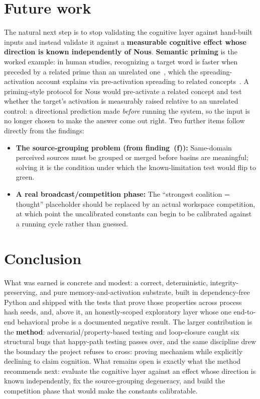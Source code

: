 \documentclass[11pt]{article}
\begin{document}
\section{Future work}\label{sec:future}
The natural next step is to stop validating the cognitive layer against hand-built inputs and instead
validate it against a \textbf{measurable cognitive effect whose direction is known independently of
Nous}. \textbf{Semantic priming} is the worked example: in human studies, recognizing a target word is
faster when preceded by a related prime than an unrelated one~\cite{meyer1971}, which the
spreading-activation account explains via pre-activation spreading to related concepts~\cite{collins1975}.
A priming-style protocol for Nous would pre-activate a related concept and test whether the target's
activation is measurably raised relative to an unrelated control: a directional prediction made
\emph{before} running the system, so the input is no longer chosen to make the answer come out right.
Two further items follow directly from the findings:
\begin{itemize}[nosep]
  \item \textbf{The source-grouping problem (from finding~(f)):} Same-domain perceived sources must be
        grouped or merged before basins are meaningful; solving it is the condition under which the
        known-limitation test would flip to green.
  \item \textbf{A real broadcast/competition phase:} The ``strongest coalition = thought'' placeholder
        should be replaced by an actual workspace competition, at which point the uncalibrated constants
        can begin to be calibrated against a running cycle rather than guessed.
\end{itemize}

\section{Conclusion}
What was earned is concrete and modest: a correct, deterministic, integrity-preserving, and pure
memory-and-activation substrate, built in dependency-free Python and shipped with the tests that prove
those properties across process hash seeds, and, above it, an honestly-scoped exploratory layer whose
one end-to-end behavioral probe is a documented negative result. The larger contribution is the
\textbf{method}: adversarial/property-based testing and loop-closure caught six structural bugs that
happy-path testing passes over, and the same discipline drew the boundary the project refuses to
cross: proving mechanism while explicitly declining to claim cognition. What remains open is exactly
what the method recommends next: evaluate the cognitive layer against an effect whose direction is known
independently, fix the source-grouping degeneracy, and build the competition phase that would make the
constants calibratable.
\end{document}
